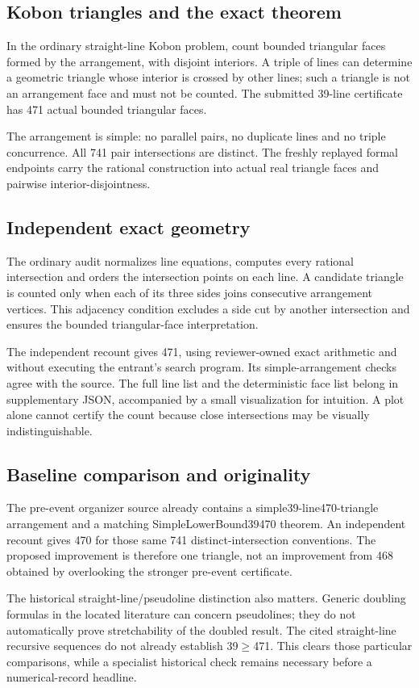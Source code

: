 \documentclass[11pt,a4paper]{article}
\begin{document}
\subsection{Kobon triangles and the exact theorem}
In the ordinary straight-line Kobon problem, count bounded triangular faces formed by the arrangement, with disjoint interiors. A triple of lines can determine a geometric triangle whose interior is crossed by other lines; such a triangle is not an arrangement face and must not be counted. The submitted 39-line certificate has 471 actual bounded triangular faces.

The arrangement is simple: no parallel pairs, no duplicate lines and no triple concurrence. All 741 pair intersections are distinct. The freshly replayed formal endpoints carry the rational construction into actual real triangle faces and pairwise interior-disjointness.

\subsection{Independent exact geometry}
The ordinary audit normalizes line equations, computes every rational intersection and orders the intersection points on each line. A candidate triangle is counted only when each of its three sides joins consecutive arrangement vertices. This adjacency condition excludes a side cut by another intersection and ensures the bounded triangular-face interpretation.

The independent recount gives 471, using reviewer-owned exact arithmetic and without executing the entrant's search program. Its simple-arrangement checks agree with the source. The full line list and the deterministic face list belong in supplementary JSON, accompanied by a small visualization for intuition. A plot alone cannot certify the count because close intersections may be visually indistinguishable.

\subsection{Baseline comparison and originality}
The pre-event organizer source already contains a simple39-line470-triangle arrangement and a matching SimpleLowerBound39470 theorem. An independent recount gives 470 for those same 741 distinct-intersection conventions. The proposed improvement is therefore one triangle, not an improvement from 468 obtained by overlooking the stronger pre-event certificate.

The historical straight-line/pseudoline distinction also matters. Generic doubling formulas in the located literature can concern pseudolines; they do not automatically prove stretchability of the doubled result. The cited straight-line recursive sequences do not already establish 39\ensuremath{\geq}471. This clears those particular comparisons, while a specialist historical check remains necessary before a numerical-record headline.
\end{document}
